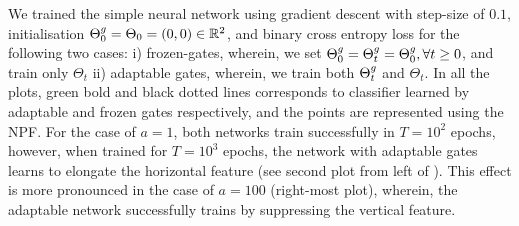 We trained the simple neural network using gradient descent with step-size of $0.1$, initialisation ${\Theta}^g_0=\Theta_0=(0,0)\in\mathbb{R}^2$, and binary cross entropy loss for the following two cases: i) frozen-gates, wherein, we set ${\Theta}^g_0={\Theta}^g_t={\Theta}^g_0,\forall t\geq 0$, and train only $\Theta_t$ ii) adaptable gates, wherein, we train both ${\Theta}^g_t$ and $\Theta_t$. In all the plots, green bold and black dotted lines corresponds to classifier learned  by adaptable and frozen gates respectively, and the points are represented using the NPF.
For the case of $a=1$, both networks train successfully in $T=10^2$ epochs, however, when trained for $T=10^3$ epochs, the network with adaptable gates learns to elongate the horizontal feature (see second plot from left of ). This effect is more pronounced in the case of $a=100$ (right-most plot), wherein, the adaptable network successfully trains by suppressing the vertical feature. 
\FloatBarrier
